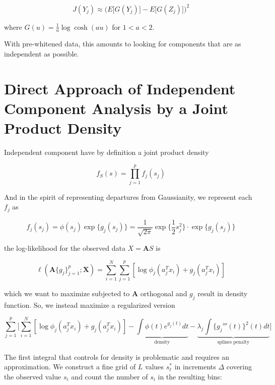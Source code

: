 \documentclass{article}
\begin{document}
\begin{equation}
	J(Y_j) \approx \bigg(E\big[G(Y_j)\big] - E\big[ G(Z_j) \big] \bigg)^2
\end{equation}

where $G(u) = \frac{1}{a}\log\cosh (au)$ for $1 < a < 2$.

With pre-whitened data, this amounts to looking for components that are as independent as possible.

\section{Direct Approach of Independent Component Analysis by a Joint Product Density}

Independent component have by definition a joint product density

\begin{equation}
	f_S(s) = \prod_{j = 1}^p f_j(s_j)
\end{equation}

And in the spirit of representing departures from Gaussianity, we represent each $f_j$ as

\begin{equation}
	f_j(s_j) = \phi(s_j)\exp\{g_j(s_j) \} = \frac{1}{\sqrt{2\pi}}\exp\{\frac{1}{2}s_j^2 \}\cdot \exp\{g_j(s_j) \}
\end{equation}

the log-likelihood for the observed data $X = \pmb A S$ is

\begin{equation}
	\ell(\pmb A\{g_j\}_{j=1}^p; \pmb X) = \sum_{i=1}^N\sum_{j=1}^p[\log \phi_j(a_j^Tx_i) + g_j(a_j^Tx_i) ]
\end{equation}

which we want to maximize subjected to $\pmb A$ orthogonal and $g_j$ result in density function. So, we instead maximize a regularized version 

\begin{equation}
	\sum_{j=1}^p\Big[ \sum_{i=1}^N [\log \phi_j(a_j^Tx_i) + g_j(a_j^Tx_i) ] - \underbrace{\int \phi(t)e^{g_j(t)}dt}_{\text{density}} - \underbrace{\lambda_j\int\{g_j'''(t) \}^2(t)dt}_{\text{splines penalty}}  \Big]
\end{equation}

The first integral that controls for density is problematic and requires an approximation. We construct a fine grid of $L$ values $s_\ell^*$ in increments $\Delta$ covering the observed value $s_i$ and count the number of $s_i$ in the resulting bins:
\end{document}
